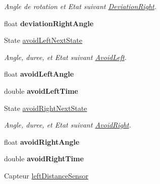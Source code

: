 \begin{DoxyCompactItemize}
\begin{DoxyCompactList}\small\item\em Angle de rotation et Etat suivant \hyperlink{class_deviation_right}{Deviation\-Right}. \end{DoxyCompactList}\item 
\hypertarget{struct_profil_aca1c9f88ddfe16110c7f0d7ac9353ba2}{float {\bfseries deviation\-Right\-Angle}}\label{struct_profil_aca1c9f88ddfe16110c7f0d7ac9353ba2}

\item 
\hypertarget{struct_profil_ad9e3508340f62e3aff7f70a609aed331}{State \hyperlink{struct_profil_ad9e3508340f62e3aff7f70a609aed331}{avoid\-Left\-Next\-State}}\label{struct_profil_ad9e3508340f62e3aff7f70a609aed331}

\begin{DoxyCompactList}\small\item\em Angle, duree, et Etat suivant \hyperlink{class_avoid_left}{Avoid\-Left}. \end{DoxyCompactList}\item 
\hypertarget{struct_profil_ae7e465ab27b0e6ee20d714f1ffea0368}{float {\bfseries avoid\-Left\-Angle}}\label{struct_profil_ae7e465ab27b0e6ee20d714f1ffea0368}

\item 
\hypertarget{struct_profil_a9d793b487258bd58afcd635db32d34ab}{double {\bfseries avoid\-Left\-Time}}\label{struct_profil_a9d793b487258bd58afcd635db32d34ab}

\item 
\hypertarget{struct_profil_a3bc87bba35a4bd52c2b076420bb66753}{State \hyperlink{struct_profil_a3bc87bba35a4bd52c2b076420bb66753}{avoid\-Right\-Next\-State}}\label{struct_profil_a3bc87bba35a4bd52c2b076420bb66753}

\begin{DoxyCompactList}\small\item\em Angle, duree, et Etat suivant \hyperlink{class_avoid_right}{Avoid\-Right}. \end{DoxyCompactList}\item 
\hypertarget{struct_profil_a392c043efdb2802f546016d134e28fa9}{float {\bfseries avoid\-Right\-Angle}}\label{struct_profil_a392c043efdb2802f546016d134e28fa9}

\item 
\hypertarget{struct_profil_ab05635fb8f4f206e218520a769be42e8}{double {\bfseries avoid\-Right\-Time}}\label{struct_profil_ab05635fb8f4f206e218520a769be42e8}

\item 
\hypertarget{struct_profil_a8c145a52387b4a737d33c4c9625637b6}{Capteur \hyperlink{struct_profil_a8c145a52387b4a737d33c4c9625637b6}{left\-Distance\-Sensor}}\label{struct_profil_a8c145a52387b4a737d33c4c9625637b6}


\end{DoxyCompactItemize}
